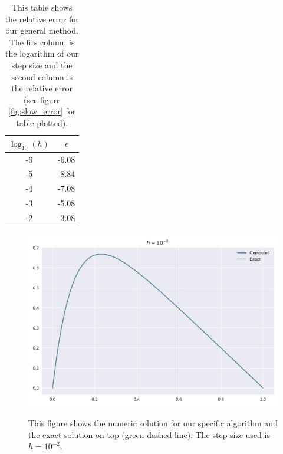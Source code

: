 \documentclass[reprint, english,notitlepage]{revtex4-1}  %
\begin{document}
\begin{table} [h]  %
	\begin{tabular}{||c | c||}
			\hline
			$\log_{10}(h)$ & $\epsilon$    \\ \hline
			-6 & -6.08    \\ \hline
			-5 & -8.84    \\ \hline
			-4 & -7.08    \\ \hline
			-3 & -5.08    \\ \hline
			-2 & -3.08    \\ \hline
	\end{tabular}
	\caption{This table shows the relative error for our general method. The firs column is the logarithm of our step size and the second column is the relative error (see figure \ref{fig:slow_error} for table plotted).}
	\label{tab:slow_error}
\end{table}


\begin{figure}[h]
	\centering
	\includegraphics[scale=0.5]{../output/fast_2.pdf}
	\label{fig:fast_2}
	\caption{This figure shows the numeric solution for our specific algorithm and the exact solution on top (green dashed line). The step size used is $h=10^{-2}$.} 
\end{figure}
\end{document}
